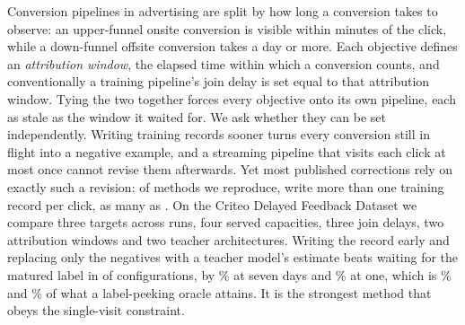 Conversion pipelines in advertising are split by how long a conversion takes to observe: an
upper-funnel onsite conversion is visible within minutes of the click, while a down-funnel
offsite conversion takes a day or more. Each objective defines an \emph{attribution window}, the
elapsed time within which a conversion counts, and conventionally a training pipeline's join
delay is set equal to that attribution window. Tying the two together forces every objective
onto its own pipeline, each as stale as the window it waited for. We ask whether they can be set
independently. Writing training records sooner turns every conversion still in flight into a
negative example, and a streaming pipeline that visits each click at most once cannot revise
them afterwards. Yet most published corrections rely on exactly such a revision: of
\nScreened{} methods we reproduce, \nFail{} write more than one training record per click, as
many as \maxDup{}. On the Criteo Delayed Feedback Dataset we compare three targets across
\nRunsBoth{} runs, four served capacities, three join delays, two attribution windows and two
teacher architectures. Writing the record early and replacing only the negatives with a teacher
model's estimate beats waiting for the matured label in \cdBeatWait{} of \nCellsBoth{}
configurations, by \cdSevenMeanAbs{}\% at seven days and \cdOneMeanAbs{}\% at one, which is
\recoverSeven{}\% and \recoverOne{}\% of what a label-peeking oracle attains. It is the
strongest method that obeys the single-visit constraint.
